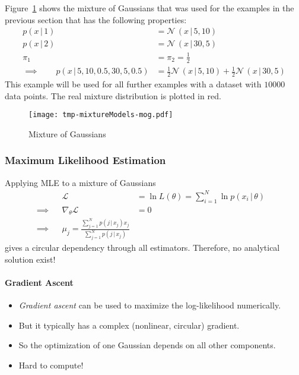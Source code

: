 \documentclass[a4paper, 11pt, accentcolor = tud3b]{tudreport}
\newcommand{\given}{\ensuremath{\,\vert\,}}
\begin{document}
				Figure~\ref{fig:mog} shows the mixture of Gaussians that was used for the examples in the previous section that has the following properties:
				\begin{align}
					p(x \given 1) &= \mathcal{N}\,(x \given 5, 10) \\
					p(x \given 2) &= \mathcal{N}\,(x \given 30, 5) \\
					\pi_1 &= \pi_2 = \frac{1}{2} \\
					\implies\qquad p(x \given 5, 10, 0.5, 30, 5, 0.5) &= \frac{1}{2} \mathcal{N}\,(x \given 5, 10) + \frac{1}{2} \mathcal{N}\,(x \given 30, 5)
				\end{align}
				This example will be used for all further examples with a dataset with \(10000\) data points. The real mixture distribution is plotted in red.

				\begin{figure}
					\centering
					\texttt{[image: tmp-mixtureModels-mog.pdf]}
					\caption{Mixture of Gaussians}
					\label{fig:mog}
				\end{figure}

				\subsubsection{Maximum Likelihood Estimation}
					Applying MLE to a mixture of Gaussians
					\begin{align}
						&& \mathcal{L} &= \ln L(\theta) = \sum_{i = 1}^{N} \ln p(x_i \given \theta) & \\
						\implies && \nabla_\theta \mathcal{L} &= 0 & \\
						\implies && \mu_j = \frac{\sum_{j = 1}^{N} p(j \given x_j) x_j}{\sum_{j = 1}^{N} p(j \given x_j)}
					\end{align}
					gives a circular dependency through all estimators. Therefore, no analytical solution exist!

					\paragraph{Gradient Ascent}
						\begin{itemize}
							\item \emph{Gradient ascent} can be used to maximize the log-likelihood numerically.
							\item But it typically has a complex (nonlinear, circular) gradient.
							\item So the optimization of one Gaussian depends on all other components.
							\item Hard to compute!
						\end{itemize}
\end{document}
